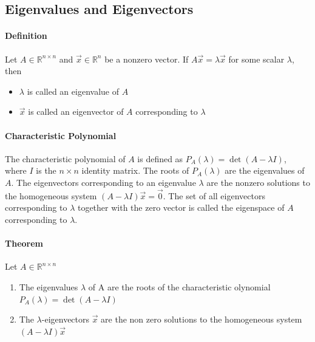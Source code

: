 \subsection*{Eigenvalues and Eigenvectors}
\paragraph*{Definition}
Let $A \in \mathbb{R}^{n\times n}$ and $\vec{x} \in \mathbb{R}^n$ be a nonzero vector. If $A\vec{x} = \lambda \vec{x}$ for some scalar $\lambda$, then
\begin{itemize}
    \item $\lambda$ is called an eigenvalue of $A$
    \item $\vec{x}$ is called an eigenvector of $A$ corresponding to $\lambda$
\end{itemize}

\paragraph*{Characteristic Polynomial}
The characteristic polynomial of $A$ is defined as $P_A(\lambda) = \det(A - \lambda I)$, where $I$ is the $n\times n$ identity matrix. 
The roots of $P_A(\lambda)$ are the eigenvalues of $A$. The eigenvectors corresponding to an eigenvalue $\lambda$ are the nonzero solutions 
to the homogeneous system $(A - \lambda I)\vec{x} = \vec{0}$. The set of all eigenvectors corresponding to $\lambda$ together with the zero 
vector is called the eigenspace of $A$ corresponding to $\lambda$.

\paragraph*{Theorem}
Let $A \in \mathbb{R}^{n\times n}$
\begin{enumerate}
    \item The eigenvalues $\lambda$ of A are the roots of the characteristic olynomial $P_A(\lambda) = \det(A-\lambda I)$
    \item The $\lambda$-eigenvectors $\vec{x}$ are the non zero solutions to the homogeneous system $(A - \lambda I)\vec{x}$
\end{enumerate}

